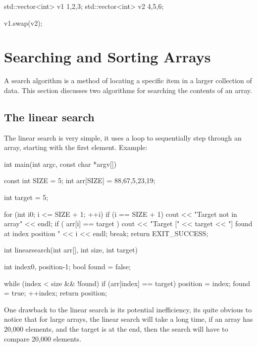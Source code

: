 \documentclass{report}
\begin{document}
    \begin{cppcode}
std::vector<int> v1 {1,2,3};
std::vector<int> v2 {4,5,6};

v1.swap(v2);
    \end{cppcode}
    

    \pagebreak \bigbreak \noindent 
    \section{\LARGE Searching and Sorting Arrays}
    \bigbreak \noindent 
    \begin{concept}
 A search algorithm is a method of locating a specific item in a larger collection of data. This section discusses two algorithms for searching the contents of an array.
	\end{concept}
    \bigbreak \noindent 
    \subsection{The linear search}
    \bigbreak \noindent 
    The linear search is very simple, it uses a loop to sequentially step through an array, starting with the first element.
    \bigbreak \noindent 
    Example:
    \bigbreak \noindent 
    
    \begin{cppcode}
int main(int argc, const char *argv[]) {

    const int SIZE = 5;
    int arr[SIZE] = {88,67,5,23,19};

    int target = 5;

    for (int i{0}; i <= SIZE + 1; ++i) {
        if (i == SIZE + 1) {
            cout << "Target not in array" << endl;
        }
        if ( arr[i] == target ) {
            cout << "Target [" << target << "] found at index position " << i << endl;
            break;
        }
    }
    return EXIT_SUCCESS;
}
    \end{cppcode}
    
    \bigbreak \noindent 
    
    \begin{cppcode}
int linearsearch(int arr[], int size, int target) {
    int index{0}, position{-1};
    bool found = false;

    while (index < size && !found) {
        if (arr[index] == target) {
            position = index;
            found = true;
        }
        ++index;
    }
    return position;
}
    \end{cppcode}
    
    \bigbreak \noindent 
    \pagebreak \bigbreak \noindent 
    One drawback to the linear search is its potential inefficiency, its quite obvious to notice that for large arrays, the linear search will take a long time, if an array has 20,000 elements, and the target is at the end, then the search will have to compare 20,000 elements.
    \bigbreak \noindent 
\end{document}
